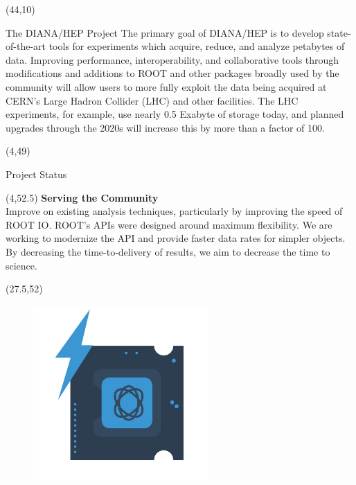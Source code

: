 \documentclass[final]{beamer}
\begin{document}
\begin{frame}{}
\begin{textblock}{38.0}(44,10)
\begin{block}{The DIANA/HEP Project}
The primary goal of DIANA/HEP is to develop state-of-the-art tools
for experiments which acquire, reduce, and analyze petabytes of
data. Improving performance, interoperability, and collaborative
tools through modifications and additions to ROOT and other packages
broadly used by the community will allow users to more fully exploit
the data being acquired at CERN's Large Hadron Collider (LHC) and
other facilities. The LHC experiments, for example, use nearly 0.5 Exabyte of
storage today, and planned upgrades through the 2020s will increase this
by more than a factor of 100. 
\end{block}
\end{textblock}

\begin{textblock}{78.0}(4,49)
\begin{block}{Project Status}
\end{block}
\end{textblock}

\begin{textblock}{22.5}(4,52.5)
\textcolor{mybluelabel}{\bf Serving the Community} \\
Improve on existing analysis techniques, particularly by improving the speed of ROOT IO.
ROOT's APIs were designed around maximum flexibility.  We are working to modernize the API
and provide faster data rates for simpler objects.
By decreasing the time-to-delivery of results, we aim to decrease the time to science.
\end{textblock}

\begin{textblock}{12.5}(27.5,52)
\begin{figure}[tbph]
\centering
\includegraphics[width=0.6\textwidth]{images/faster-processing.jpg}
\end{figure}
\end{textblock}


\end{frame}
\end{document}
